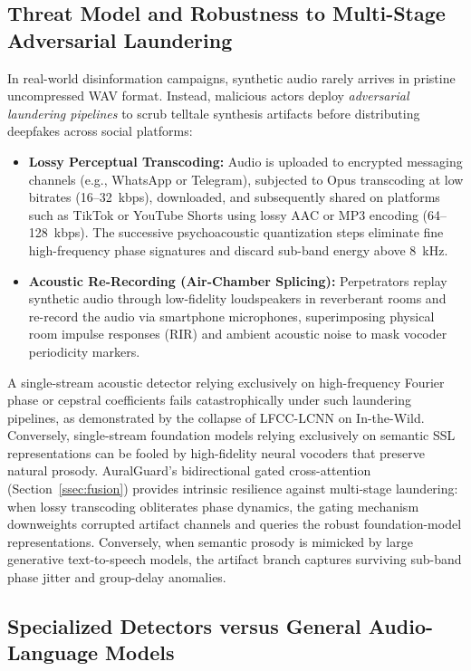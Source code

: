 \subsection{Threat Model and Robustness to Multi-Stage Adversarial Laundering}
\label{ssec:laundering}

In real-world disinformation campaigns, synthetic audio rarely arrives in pristine uncompressed WAV format. Instead, malicious actors deploy \emph{adversarial laundering pipelines} to scrub telltale synthesis artifacts before distributing deepfakes across social platforms:
\begin{itemize}
\item \textbf{Lossy Perceptual Transcoding:} Audio is uploaded to encrypted messaging channels (e.g., WhatsApp or Telegram), subjected to Opus transcoding at low bitrates (16--32~kbps), downloaded, and subsequently shared on platforms such as TikTok or YouTube Shorts using lossy AAC or MP3 encoding (64--128~kbps). The successive psychoacoustic quantization steps eliminate fine high-frequency phase signatures and discard sub-band energy above 8~kHz.
\item \textbf{Acoustic Re-Recording (Air-Chamber Splicing):} Perpetrators replay synthetic audio through low-fidelity loudspeakers in reverberant rooms and re-record the audio via smartphone microphones, superimposing physical room impulse responses (RIR) and ambient acoustic noise to mask vocoder periodicity markers.
\end{itemize}

A single-stream acoustic detector relying exclusively on high-frequency Fourier phase or cepstral coefficients fails catastrophically under such laundering pipelines, as demonstrated by the collapse of LFCC-LCNN on In-the-Wild. Conversely, single-stream foundation models relying exclusively on semantic SSL representations can be fooled by high-fidelity neural vocoders that preserve natural prosody. AuralGuard's bidirectional gated cross-attention (Section~\ref{ssec:fusion}) provides intrinsic resilience against multi-stage laundering: when lossy transcoding obliterates phase dynamics, the gating mechanism downweights corrupted artifact channels and queries the robust foundation-model representations. Conversely, when semantic prosody is mimicked by large generative text-to-speech models, the artifact branch captures surviving sub-band phase jitter and group-delay anomalies.

\subsection{Specialized Detectors versus General Audio-Language Models}
\label{ssec:specialized_vs_allm}

